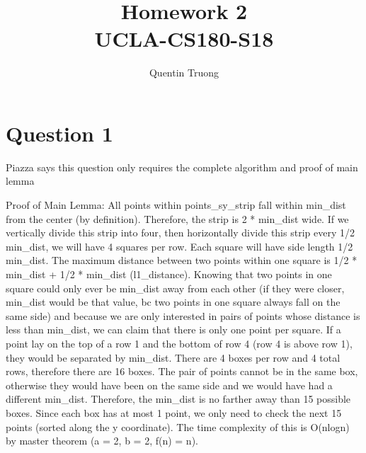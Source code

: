 \documentclass[11pt, oneside]{article}
\title{Homework 2\\UCLA-CS180-S18}
\author{Quentin Truong}
\begin{document}
\maketitle
{}


\section{Question 1}

Piazza says this question only requires the complete algorithm and proof of main lemma \newline

Proof of Main Lemma: \newline
All points within points\_sy\_strip fall within min\_dist from the center (by definition).
Therefore, the strip is 2 * min\_dist wide.
If we vertically divide this strip into four, then horizontally divide this strip every 1/2 min\_dist, we will have 4 squares per row.
Each square will have side length 1/2 min\_dist.
The maximum distance between two points within one square is 1/2 * min\_dist + 1/2 * min\_dist (l1\_distance).
Knowing that two points in one square could only ever be min\_dist away from each other (if they were closer, min\_dist would be that value, bc two points in one square always fall on the same side)
and because we are only interested in pairs of points whose distance is less than min\_dist, we can claim that there is only one point per square.
If a point lay on the top of a row 1 and the bottom of row 4 (row 4 is above row 1), they would be separated by min\_dist. 
There are 4 boxes per row and 4 total rows, therefore there are 16 boxes.
The pair of points cannot be in the same box, otherwise they would have been on the same side and we would have had a different min\_dist.
Therefore, the min\_dist is no farther away than 15 possible boxes.
Since each box has at most 1 point, we only need to check the next 15 points (sorted along the y coordinate).
The time complexity of this is O(nlogn) by master theorem (a = 2, b = 2, f(n) = n).
\end{document}
